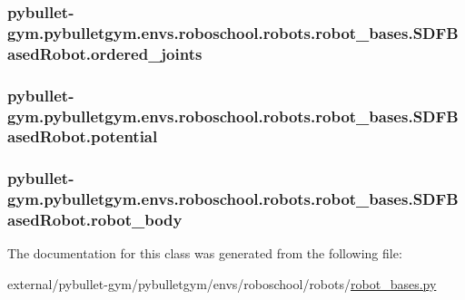 \subsubsection[{\texorpdfstring{ordered\+\_\+joints}{ordered_joints}}]{\setlength{\rightskip}{0pt plus 5cm}pybullet-\/gym.\+pybulletgym.\+envs.\+roboschool.\+robots.\+robot\+\_\+bases.\+S\+D\+F\+Based\+Robot.\+ordered\+\_\+joints}\hypertarget{classpybullet-gym_1_1pybulletgym_1_1envs_1_1roboschool_1_1robots_1_1robot__bases_1_1_s_d_f_based_robot_a4f88a97d50a144a299e37c47b2dbfca1}{}\label{classpybullet-gym_1_1pybulletgym_1_1envs_1_1roboschool_1_1robots_1_1robot__bases_1_1_s_d_f_based_robot_a4f88a97d50a144a299e37c47b2dbfca1}
\subsubsection[{\texorpdfstring{potential}{potential}}]{\setlength{\rightskip}{0pt plus 5cm}pybullet-\/gym.\+pybulletgym.\+envs.\+roboschool.\+robots.\+robot\+\_\+bases.\+S\+D\+F\+Based\+Robot.\+potential}\hypertarget{classpybullet-gym_1_1pybulletgym_1_1envs_1_1roboschool_1_1robots_1_1robot__bases_1_1_s_d_f_based_robot_aaa477f63a2dfdb70bce8cc01ac0c44fd}{}\label{classpybullet-gym_1_1pybulletgym_1_1envs_1_1roboschool_1_1robots_1_1robot__bases_1_1_s_d_f_based_robot_aaa477f63a2dfdb70bce8cc01ac0c44fd}
\subsubsection[{\texorpdfstring{robot\+\_\+body}{robot_body}}]{\setlength{\rightskip}{0pt plus 5cm}pybullet-\/gym.\+pybulletgym.\+envs.\+roboschool.\+robots.\+robot\+\_\+bases.\+S\+D\+F\+Based\+Robot.\+robot\+\_\+body}\hypertarget{classpybullet-gym_1_1pybulletgym_1_1envs_1_1roboschool_1_1robots_1_1robot__bases_1_1_s_d_f_based_robot_ab58fe4afef4f734804e3608cdc373e52}{}\label{classpybullet-gym_1_1pybulletgym_1_1envs_1_1roboschool_1_1robots_1_1robot__bases_1_1_s_d_f_based_robot_ab58fe4afef4f734804e3608cdc373e52}


The documentation for this class was generated from the following file\+:\begin{DoxyCompactItemize}
\item 
external/pybullet-\/gym/pybulletgym/envs/roboschool/robots/\hyperlink{roboschool_2robots_2robot__bases_8py}{robot\+\_\+bases.\+py}\end{DoxyCompactItemize}
